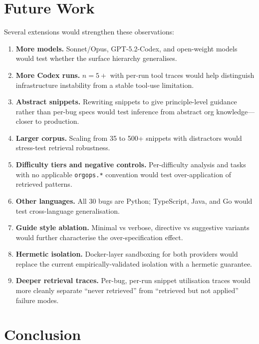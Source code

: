 \documentclass[10pt,a4paper,twocolumn]{article}
\begin{document}
\section{Future Work}
\label{sec:future-work}

Several extensions would strengthen these observations:

\begin{enumerate}
    \item \textbf{More models.} Sonnet/Opus, GPT-5.2-Codex, and open-weight models would test whether the surface hierarchy generalises.
    \item \textbf{More Codex runs.} $n{=}5+$ with per-run tool traces would help distinguish infrastructure instability from a stable tool-use limitation.
    \item \textbf{Abstract snippets.} Rewriting snippets to give principle-level guidance rather than per-bug specs would test inference from abstract org knowledge---closer to production.
    \item \textbf{Larger corpus.} Scaling from 35 to 500+ snippets with distractors would stress-test retrieval robustness.
    \item \textbf{Difficulty tiers and negative controls.} Per-difficulty analysis and tasks with no applicable \texttt{orgops.*} convention would test over-application of retrieved patterns.
    \item \textbf{Other languages.} All 30 bugs are Python; TypeScript, Java, and Go would test cross-language generalisation.
    \item \textbf{Guide style ablation.} Minimal vs verbose, directive vs suggestive variants would further characterise the over-specification effect.
    \item \textbf{Hermetic isolation.} Docker-layer sandboxing for both providers would replace the current empirically-validated isolation with a hermetic guarantee.
    \item \textbf{Deeper retrieval traces.} Per-bug, per-run snippet utilisation traces would more cleanly separate ``never retrieved'' from ``retrieved but not applied'' failure modes.
\end{enumerate}

\section{Conclusion}
\label{sec:conclusion}
\end{document}
